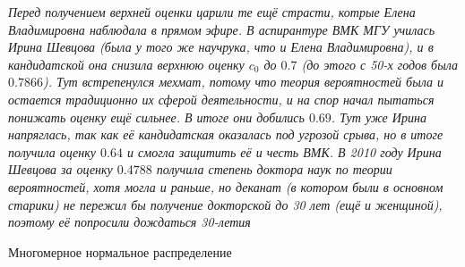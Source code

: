 \renewcommand{\thletter}{неравенство Берри-Эссеена}
\textit{Перед получением верхней оценки царили те ещё страсти, котрые Елена Владимировна наблюдала в прямом эфире. В аспирантуре ВМК МГУ училась Ирина Шевцова (была у того же научрука, что и Елена Владимировна), и в кандидатской она снизила верхнюю оценку $c_0$ до $0.7$ (до этого с 50-х годов была $0.7866$). Тут встрепенулся мехмат, потому что теория вероятностей была и остается традиционно их сферой деятельности, и на спор начал пытаться понижать оценку ещё сильнее. В итоге они добились $0.69$. Тут уже Ирина напряглась, так как её кандидатская оказалась под угрозой срыва, но в итоге получила оценку $0.64$ и смогла защитить её и честь ВМК. В 2010 году Ирина Шевцова за оценку $0.4788$ получила степень доктора наук по теории вероятностей, хотя могла и раньше, но деканат (в котором были в основном старики) не пережил бы получение докторской до 30 лет (ещё и женщиной), поэтому её попросили дождаться 30-летия}
\newpage
\begin{center}
    \huge Многомерное нормальное распределение
\end{center}
\setcounter{maindf}{12}
\setcounter{subdf}{0}

\setcounter{mainth}{12}
\setcounter{subth}{0}

\setcounter{mainpr}{12}
\setcounter{subpr}{0}

